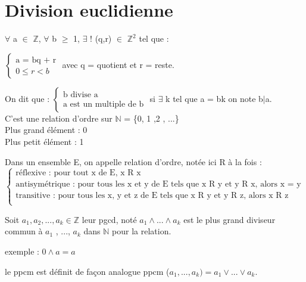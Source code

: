 \section{Division euclidienne}
\begin{thm}
	$\forall$ a $\in$ $\mathbb{Z}$, $\forall$ b $\geq$ 1, $\exists$ ! (q,r) $\in$ $\mathbb{Z}^2$ tel que : 
	\begin{center}
		$\left\{
			\begin{array}{ll}
				\mbox{a = bq + r} \\
				0 \leq r < b
			\end{array}
		\right.$
		avec q = quotient et r = reste. \\
	\end{center}
	On dit que :
	$\left\{
	\begin{array}{ll}
		\mbox{b divise a} \\
		\mbox{a est un multiple de b}
	\end{array}
	\right.$
	si $\exists$ k tel que a = bk on note b$\mid$a. \\
	C'est une relation d'ordre sur $\mathbb{N}$ = \{0, 1 ,2 , ...\} \\
	Plus grand élément : 0 \\
	Plus petit élément : 1 \\
\end{thm}
\begin{rap}
	Dans un ensemble E, on appelle relation d'ordre, notée ici R à la fois :\\
	$\left\{
	\begin{array}{ll}
		\mbox{réflexive : pour tout x de E, x R x}\\
		\mbox{antisymétrique : pour tous les x et y de E tels que x R y et y R x, alors x = y}\\
		\mbox{transitive : pour tous les x, y et z de E tels que x R y et y R z, alors x R z}\\
	\end{array}
	\right.$
\end{rap}
\begin{defi}
	Soit $a_{1}, a_{2}, ..., a_{k} \in \mathbb{Z}$
	leur pgcd, noté $a_{1} \wedge ... \wedge a_{k} $
	est le plus grand diviseur commun à $a_{1}$ , ..., $a_{k}$ dans $\mathbb{N}$ pour la relation.
\end{defi}
\begin{ex}
	exemple : $0 \wedge a = a$
\end{ex}
\begin{defi}
	le ppcm est définit de façon analogue ppcm ($a_{1}, ..., a_{k}) = a_{1} \lor ... \lor a_{k}$.
\end{defi}

